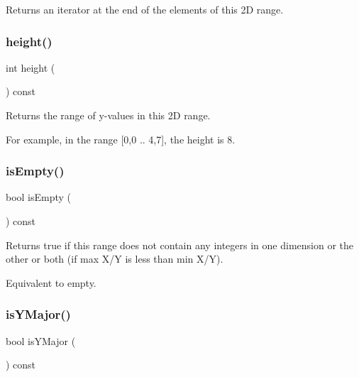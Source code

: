 Returns an iterator at the end of the elements of this 2D range. 

\mbox{\label{classIntRange2D_ad3774f6419003470f54fd495124ef51f}} 
\subsubsection{\texorpdfstring{height()}{height()}}
{\footnotesize\ttfamily int height (\begin{DoxyParamCaption}{ }\end{DoxyParamCaption}) const}



Returns the range of y-\/values in this 2D range. 

For example, in the range \mbox{[}0,0 .. 4,7\mbox{]}, the height is 8. \mbox{\label{classIntRange2D_acf82f9b2937375c7b1cf3dccb3df3312}} 
\subsubsection{\texorpdfstring{is\+Empty()}{isEmpty()}}
{\footnotesize\ttfamily bool is\+Empty (\begin{DoxyParamCaption}{ }\end{DoxyParamCaption}) const}



Returns true if this range does not contain any integers in one dimension or the other or both (if max X/Y is less than min X/Y). 

Equivalent to empty. \mbox{\label{classIntRange2D_a7387191f7e5206084124db7bc29d1891}} 
\subsubsection{\texorpdfstring{is\+Y\+Major()}{isYMajor()}}
{\footnotesize\ttfamily bool is\+Y\+Major (\begin{DoxyParamCaption}{ }\end{DoxyParamCaption}) const}



